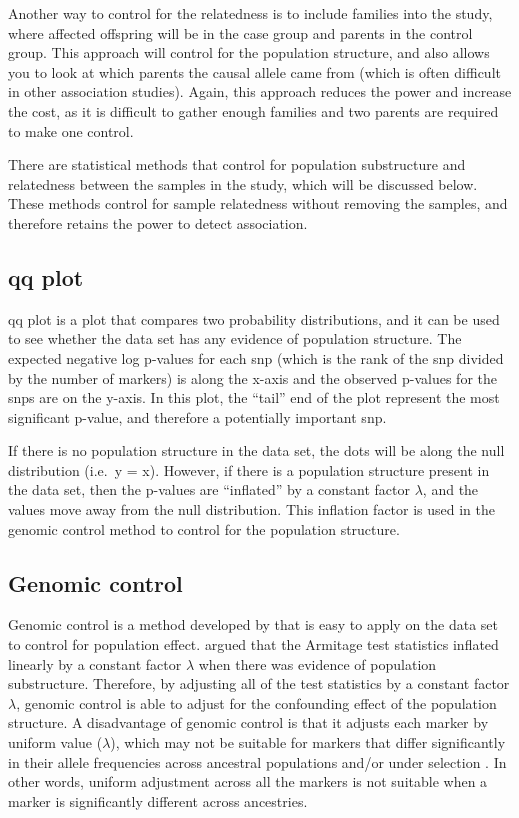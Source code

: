 Another way to control for the relatedness is to include families into the study, where affected offspring will be in the case group and parents in the control group.
This approach will control for the population structure, and also allows you to look at which parents the causal allele came from (which is often difficult in other association studies).
Again, this approach reduces the power and increase the cost, as it is difficult to gather enough families and two parents are required to make one control.

There are statistical methods that control for population substructure and relatedness between the samples in the study, which will be discussed below.
These methods control for sample relatedness without removing the samples, and therefore retains the power to detect association.

\subsection{\gls{qq} plot}
\label{sub:qq_plot}

\Gls{qq} plot is a plot that compares two probability distributions, and it can be used to see whether the data set has any evidence of population structure.
The expected negative log p-values for each \gls{snp}  (which is the rank of the \gls{snp} divided by the number of markers) is along the x-axis and the observed p-values for the \glspl{snp} are on the y-axis.
In this plot, the ``tail'' end of the plot represent the most significant p-value, and therefore a potentially important \gls{snp}.

If there is no population structure in the data set, the dots will be along the null distribution (i.e.\ y = x).
However, if there is a population structure present in the data set, then the p-values are ``inflated'' by a constant factor $\lambda$, and the values move away from the null distribution.
This inflation factor is used in the genomic control method to control for the population structure.

\subsection{Genomic control}
\label{sub:genomic_control}

Genomic control is a method developed by \citet{Devlin1999} that is easy to apply on the data set to control for population effect.
\citet{Devlin1999} argued that the Armitage test statistics inflated linearly by a constant factor $\lambda$ when there was evidence of population substructure.
Therefore, by adjusting all of the test statistics by a  constant factor $\lambda$, genomic control is able to adjust for the confounding effect of the population structure.
A disadvantage of genomic control is that it adjusts each marker by uniform value ($\lambda$), which may not be suitable for markers that differ significantly in their allele frequencies across ancestral populations and/or under selection \citep{Price2006}.
In other words, uniform adjustment across all the markers is not suitable when a marker is significantly different across ancestries.

